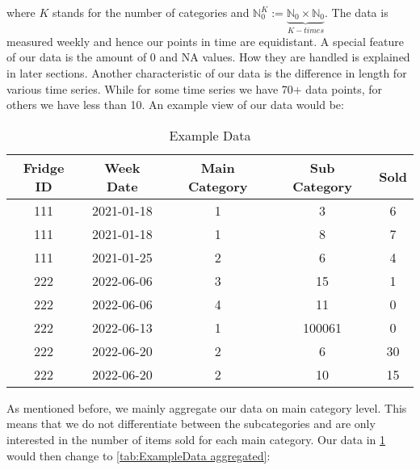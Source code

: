 where $K$ stands for the number of categories and $\mathbb{N}_0^K := \underbrace{\mathbb{N}_0 \times \mathbb{N}_0}_{K-times}$. 
The data is measured weekly and hence our points in time are equidistant. A special feature of our data is the amount of 0 and NA values. How they are handled is explained in later sections. Another characteristic of our data is the difference in length for various time series. While for some time series we have 70+ data points, for others we have less than 10. An example view of our data would be: 

% 
\begin{table}[h!]
\centering
\begin{tabular}{ccccc}
\hline
\rowcolor[HTML]{FFFFFF} 
\textbf{Fridge ID} & \textbf{Week Date} & \textbf{Main Category} & \textbf{Sub Category} & \textbf{Sold} \\ \hline
111                & 2021-01-18         & 1                      & 3                     & 6             \\
111                & 2021-01-18         & 1                      & 8                     & 7             \\
111                & 2021-01-25         & 2                      & 6                     & 4             \\
222                & 2022-06-06         & 3                      & 15                    & 1             \\
222                & 2022-06-06         & 4                      & 11                    & 0             \\
222                & 2022-06-13         & 1                      & 100061                & 0             \\
222                & 2022-06-20         & 2                      & 6                     & 30            \\
222                & 2022-06-20         & 2                      & 10                    & 15            \\ \hline
\end{tabular}
\caption{Example Data}
\label{tab:ExampleData}
\end{table}

As mentioned before, we mainly aggregate our data on main category level. This means that we do not differentiate between the subcategories and are only interested in the number of items sold for each main category. Our data in \ref{tab:ExampleData} would then change to \ref{tab:ExampleData aggregated}:

